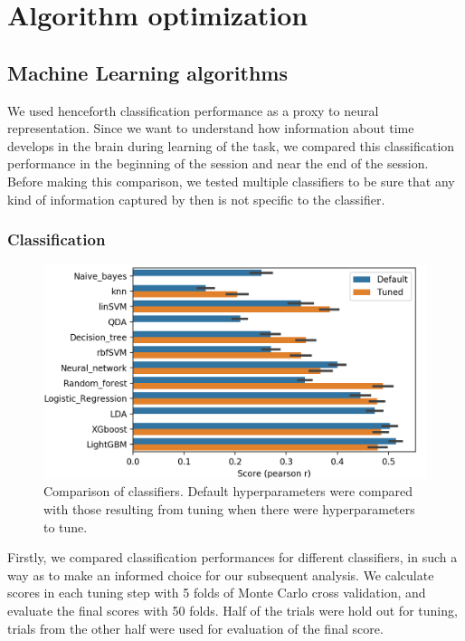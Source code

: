 \chapter{Algorithm optimization}
\label{chap:results}
\section{Machine Learning algorithms}

We used henceforth classification performance as a proxy to neural representation. Since we want to understand how information about time develops in the brain during learning of the task, we compared this classification performance in the beginning of the session and near the end of the session. Before making this comparison, we tested multiple classifiers to be sure that any kind of information captured by then is not specific to the classifier.
\subsection{Classification}
\begin{figure}
    \centering
    \includegraphics[width=\textwidth]{figures/clf_comparison.png}
    \caption[Comparison of classifiers]{Comparison of classifiers. Default hyperparameters were compared with those resulting from tuning when there were hyperparameters to tune.}
    \label{fig:clf_comparison}
\end{figure} %
Firstly, we compared classification performances for different classifiers, in such a way as to make an informed choice for our subsequent analysis. We calculate scores in each tuning step with 5 folds of Monte Carlo cross validation, and evaluate the final scores with 50 folds. Half of the trials were hold out for tuning, trials from the other half were used for evaluation of the final score.

